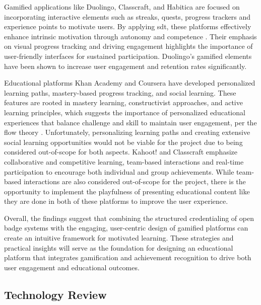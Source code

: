 Gamified applications like Duolingo, Classcraft, and Habitica are focused on incorporating interactive elements such as streaks, quests, progress trackers and experience points to motivate users. 
By applying \acrshort{sdt}, these platforms effectively enhance intrinsic motivation through autonomy and competence \cite{sdt}. 
Their emphasis on visual progress tracking and driving engagement highlights the importance of user-friendly interfaces for sustained participation. 
Duolingo’s gamified elements have been shown to increase user engagement and retention rates significantly.

Educational platforms Khan Academy and Coursera have developed personalized learning paths, mastery-based progress tracking, and social learning. 
These features are rooted in mastery learning, constructivist approaches, and active learning principles, which suggests the importance of personalized educational experiences that balance challenge and skill to maintain user engagement, per the flow theory \cite{flow}\cite{powerFeedback}. 
Unfortunately, personalizing learning paths and creating extensive social learning opportunities would not be viable for the project due to being considered out-of-scope for both aspects. 
Kahoot! and Classcraft emphasize collaborative and competitive learning, team-based interactions and real-time participation to encourage both individual and group achievements. 
While team-based interactions are also considered out-of-scope for the project, there is the opportunity to implement the playfulness of presenting educational content like they are done in both of these platforms to improve the user experience.

Overall, the findings suggest that combining the structured credentialing of open badge systems with the engaging, user-centric design of gamified platforms can create an intuitive framework for motivated learning. 
These strategies and practical insights will serve as the foundation for designing an educational platform that integrates gamification and achievement recognition to drive both user engagement and educational outcomes.

\subsection{Technology Review}

